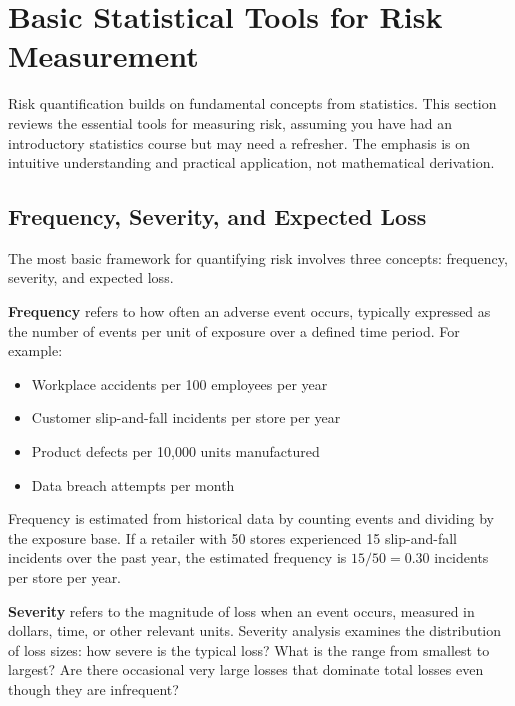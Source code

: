 \documentclass[11pt,openany]{book}
\begin{document}
\section{Basic Statistical Tools for Risk Measurement}
\label{sec:statistical-tools}

Risk quantification builds on fundamental concepts from statistics. This
section reviews the essential tools for measuring risk, assuming you have had
an introductory statistics course but may need a refresher. The emphasis is on
intuitive understanding and practical application, not mathematical derivation.

\subsection{Frequency, Severity, and Expected Loss}
\label{subsec:frequency-severity}

The most basic framework for quantifying risk involves three concepts:
frequency, severity, and expected loss.

\textbf{Frequency} refers to how often an adverse event occurs, typically
expressed as the number of events per unit of exposure over a defined time
period. For example:

\begin{itemize}
  \item Workplace accidents per 100 employees per year
  \item Customer slip-and-fall incidents per store per year
  \item Product defects per 10,000 units manufactured
  \item Data breach attempts per month
\end{itemize}

Frequency is estimated from historical data by counting events and dividing by
the exposure base. If a retailer with 50 stores experienced 15 slip-and-fall
incidents over the past year, the estimated frequency is
\(15 / 50 = 0.30\) incidents per store per year.

\textbf{Severity} refers to the magnitude of loss when an event occurs,
measured in dollars, time, or other relevant units. Severity analysis examines
the distribution of loss sizes: how severe is the typical loss? What is the
range from smallest to largest? Are there occasional very large losses that
dominate total losses even though they are infrequent?
\end{document}
